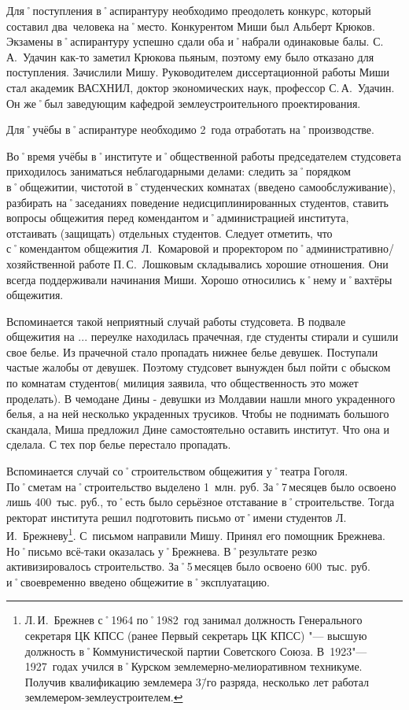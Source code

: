 Для˚поступления в˚аспирантуру необходимо преодолеть конкурс, который составил два~человека на˚место. Конкурентом Миши был Альберт Крюков. Экзамены в˚аспирантуру успешно сдали оба и˚набрали одинаковые балы. С.\,А.~Удачин как-то заметил Крюкова пьяным, поэтому ему было отказано для поступления. Зачислили Мишу. Руководителем диссертационной работы Миши стал академик ВАСХНИЛ, доктор экономических наук, профессор С.\,А.~Удачин. Он же˚был заведующим кафедрой землеустроительного проектирования.

Для˚учёбы в˚аспирантуре необходимо 2~года отработать на˚производстве.

Во˚время учёбы в˚институте и˚общественной работы председателем студсовета приходилось заниматься неблагодарными делами: следить за˚порядком в˚общежитии, чистотой в˚студенческих комнатах (введено самообслуживание), разбирать на˚заседаниях поведение недисциплинированных студентов, ставить вопросы общежития перед комендантом и˚администрацией института, отстаивать (защищать) отдельных студентов. Следует отметить, что с˚комендантом общежития Л.~Комаровой и проректором по˚административно\-/хозяйственной работе П.\,С.~Лошковым складывались хорошие отношения. Они всегда поддерживали начинания Миши. Хорошо относились к˚нему и˚вахтёры общежития.

Вспоминается такой неприятный случай работы студсовета. В подвале общежития на ... переулке находилась прачечная, где студенты стирали и сушили свое белье. Из прачечной стало пропадать нижнее белье девушек. Поступали частые жалобы от девушек. Поэтому студсовет вынужден был пойти с обыском по комнатам студентов( милиция заявила, что общественность это может проделать). В чемодане Дины - девушки из Молдавии нашли много украденного белья, а на ней несколько украденных трусиков. Чтобы не поднимать большого скандала, Миша предложил Дине самостоятельно оставить институт. Что она и сделала. С тех пор белье перестало пропадать.

Вспоминается случай со˚строительством общежития у˚театра Гоголя. По˚сметам на˚строительство выделено 1~млн. руб. За˚7\,месяцев было освоено лишь 400~тыс. руб., то˚есть было серьёзное отставание в˚строительстве. Тогда ректорат института решил подготовить письмо от˚имени студентов Л.\,И.~Брежневу\footnote{Л.\,И.~Брежнев с˚1964 по˚1982~год занимал должность Генерального секретаря ЦК КПСС (ранее Первый секретарь ЦК КПСС) "--- высшую должность в˚Коммунистической партии Советского Союза. В~1923"---1927~годах учился в˚Курском землемерно-мелиоративном техникуме. Получив квалификацию землемера 3\=/го разряда, несколько лет работал землемером-землеустроителем.}. С~письмом направили Мишу. Принял его помощник Брежнева. Но˚письмо всё-таки оказалась у˚Брежнева. В˚результате резко активизировалось строительство. За˚5\,месяцев было освоено 600~тыс. руб. и˚своевременно введено общежитие в˚эксплуатацию.

